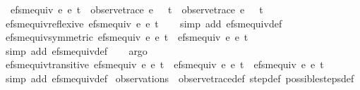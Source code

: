 \begin{isabellebody}
\ \ {\isachardoublequoteopen}efsm{\isacharunderscore}equiv\ e{}\ e{}\ t\ {\isasymequiv}\ {\isacharparenleft}{\isacharparenleft}observe{\isacharunderscore}trace\ e{}\ {}\ {\isacharless}{\isachargreater}\ t{\isacharparenright}\ {\isacharequal}\ {\isacharparenleft}observe{\isacharunderscore}trace\ e{}\ {}\ {\isacharless}{\isachargreater}\ t{\isacharparenright}{\isacharparenright}{\isachardoublequoteclose}\isanewline
\isanewline
{}\isamarkupfalse%
\ efsm{\isacharunderscore}equiv{\isacharunderscore}reflexive{\isacharcolon}\ {\isachardoublequoteopen}efsm{\isacharunderscore}equiv\ e{}\ e{}\ t{\isachardoublequoteclose}\isanewline
%
\isadelimproof
\ \ %
\endisadelimproof
%
\isatagproof
{}\isamarkupfalse%
\ {\isacharparenleft}simp\ add{\isacharcolon}\ efsm{\isacharunderscore}equiv{\isacharunderscore}def{\isacharparenright}%
\endisatagproof
{\isafoldproof}%
%
\isadelimproof
\isanewline
%
\endisadelimproof
\isanewline
{}\isamarkupfalse%
\ efsm{\isacharunderscore}equiv{\isacharunderscore}symmetric{\isacharcolon}\ {\isachardoublequoteopen}efsm{\isacharunderscore}equiv\ e{}\ e{}\ t\ {\isasymequiv}\ efsm{\isacharunderscore}equiv\ e{}\ e{}\ t{\isachardoublequoteclose}\isanewline
%
\isadelimproof
\ \ %
\endisadelimproof
%
\isatagproof
{}\isamarkupfalse%
\ {\isacharparenleft}simp\ add{\isacharcolon}\ efsm{\isacharunderscore}equiv{\isacharunderscore}def{\isacharparenright}\isanewline
\ \ \isamarkupfalse%
\ argo%
\endisatagproof
{\isafoldproof}%
%
\isadelimproof
\isanewline
%
\endisadelimproof
\isanewline
{}\isamarkupfalse%
\ efsm{\isacharunderscore}equiv{\isacharunderscore}transitive{\isacharcolon}\ {\isachardoublequoteopen}efsm{\isacharunderscore}equiv\ e{}\ e{}\ t\ {\isasymand}\ efsm{\isacharunderscore}equiv\ e{}\ e{}\ t\ {\isasymlongrightarrow}\ efsm{\isacharunderscore}equiv\ e{}\ e{}\ t{\isachardoublequoteclose}\isanewline
%
\isadelimproof
\ \ %
\endisadelimproof
%
\isatagproof
{}\isamarkupfalse%
\ {\isacharparenleft}simp\ add{\isacharcolon}\ efsm{\isacharunderscore}equiv{\isacharunderscore}def{\isacharparenright}%
\endisatagproof
{\isafoldproof}%
%
\isadelimproof
\isanewline
%
\endisadelimproof
\isanewline
{}\isamarkupfalse%
\ observations\ {\isacharequal}\ observe{\isacharunderscore}trace{\isacharunderscore}def\ step{\isacharunderscore}def\ possible{\isacharunderscore}steps{\isacharunderscore}def\isanewline

\end{isabellebody}
